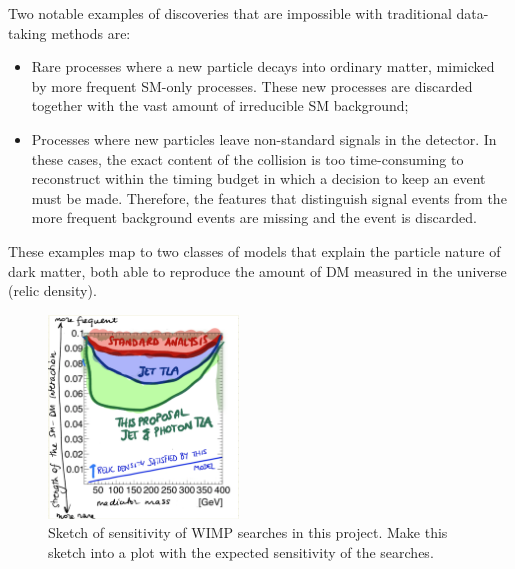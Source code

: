 \documentclass[11pt,a4paper]{article}
\begin{document}
Two notable examples of discoveries that are impossible with traditional data-taking methods are:
\begin{itemize} 
\item Rare processes where a new particle decays into ordinary matter, mimicked by more frequent SM-only processes.
These new processes are discarded together with the vast amount of irreducible SM background;%
\item Processes where new particles leave non-standard signals in the detector. 
In these cases, the exact content of the collision is too time-consuming to reconstruct within the timing budget in which a decision to keep an event must be made. Therefore, the features that distinguish signal events from the more frequent background events are missing and the event is discarded.
\end{itemize}

These examples map to two classes of models that explain the particle nature of dark matter, both able to reproduce the amount of DM measured in the universe (relic density). 

\begin{figure} 
\begin{center}
\includegraphics[width=0.45\textwidth]{figs/SensitivityWIMP.png}
\caption{Sketch of sensitivity of WIMP searches in this project. \scriptsize \color{red} Make this sketch into a plot with the expected sensitivity of the searches. \color{black}\label{fig:pastFutureConstraints} }
\end{center}
\end{figure}
\end{document}
